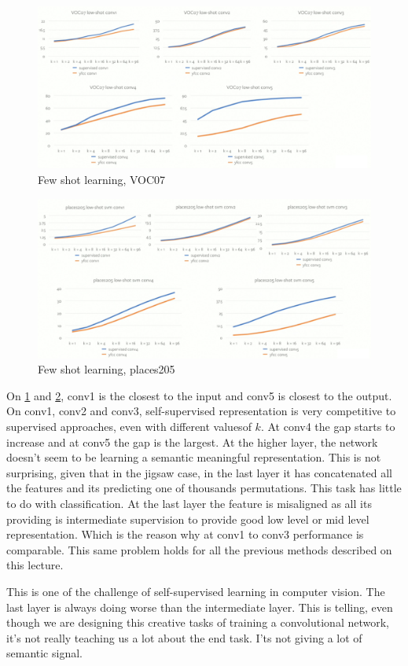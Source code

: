 \begin{figure}[H]
\centering
\includegraphics[width=0.8\linewidth]{lectures/14-b/graphics/VOC07.png}
\caption{Few shot learning, VOC07}\label{fig:VOC07}
\end{figure}
\begin{figure}[H]
\centering
\includegraphics[width=0.8\linewidth]{lectures/14-b/graphics/places205.png}
\caption{Few shot learning, places205}\label{fig:places205}
\end{figure}

On \ref{fig:VOC07} and \ref{fig:places205}, conv1 is the closest to the input and conv5 is closest to the output. On conv1, conv2 and conv3, self-supervised representation is very competitive to supervised approaches, even with different valuesof $k$. At conv4 the gap starts to increase and at conv5 the gap is the largest. At the higher layer, the network doesn't seem to be learning a semantic meaningful representation. This is not surprising, given that in the jigsaw case, in the last layer it has concatenated all the features and its predicting one of thousands permutations. This task has little to do with classification. At the last layer the feature is misaligned as all its providing is intermediate supervision to provide good low level or mid level representation. Which is the reason why at conv1 to conv3 performance is comparable. This same problem holds for all the previous methods described on this lecture. 

This is one of the challenge of self-supervised learning in computer vision. The last layer is always doing worse than the intermediate layer. This is telling, even though we are designing this creative tasks of training a convolutional network, it’s not really teaching us a lot about the end task. I’ts not giving a lot of semantic signal.

